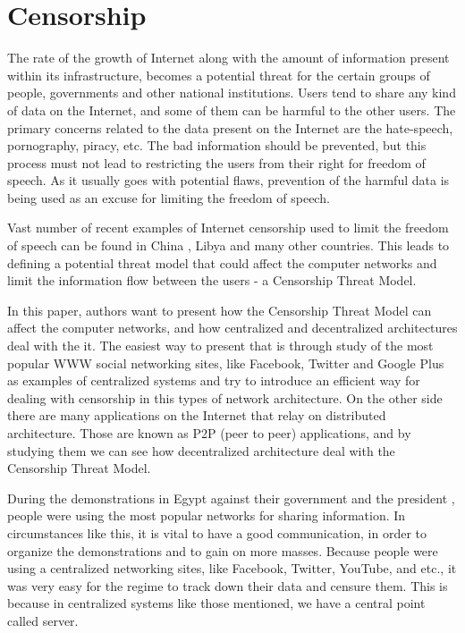 \section{Censorship}
The rate of the growth of Internet along with the amount of information present within its infrastructure, becomes a potential threat for the certain groups of people, governments and other national institutions. Users tend to share any kind of data on the Internet, and some of them can be harmful to the other users. The primary concerns related to the data present on the Internet are the hate-speech, pornography, piracy, etc. The bad information should be prevented, but this process must not lead to restricting the users from their right for freedom of speech. As it usually goes with potential flaws, prevention of the harmful data is being used as an excuse for limiting the freedom of speech. 

Vast number of recent examples of Internet censorship used to limit the freedom of speech can be found in China \cite{canaves}, Libya \cite{dianotti2011} and many other countries. 
This leads to defining a potential threat model that could affect the computer networks and limit the information flow between the users - a Censorship Threat Model.

In this paper, authors want to present how the Censorship Threat Model can affect the computer networks, and how centralized and decentralized architectures deal with the it. The easiest way to present that is through study of the most popular WWW social networking sites, like Facebook, Twitter and Google Plus as examples of centralized systems and try to introduce an efficient way for dealing with censorship in this types of network architecture. On the other side there are many applications on the Internet that relay on distributed architecture. Those are known as P2P (peer to peer) applications, and by studying them we can see how decentralized architecture deal with the Censorship Threat Model.

During the demonstrations in Egypt against their government and the president \cite{web:scialnetworkcriticalmass}, people were using the most popular networks for sharing information. In circumstances like this, it is vital to have a good communication, in order to organize the demonstrations and to gain on more masses. 
Because people were using a centralized networking sites, like Facebook, Twitter, YouTube, and etc., it was very easy for the regime to track down their data and censure them. This is because in centralized systems like those mentioned, we have a central point called server. 

